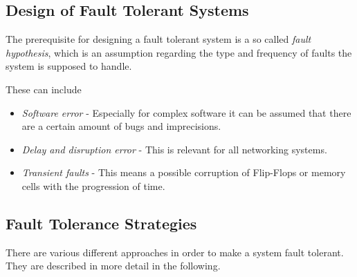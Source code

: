 \subsection{Design of Fault Tolerant Systems}
The prerequisite for designing a fault tolerant system is a so called \emph{fault hypothesis}, which is an assumption regarding the type and frequency of faults the system is supposed to handle.

These can include
\begin{itemize}
\item \emph{Software error} - Especially for complex software it can be assumed that there are a certain amount of bugs and imprecisions.
\item \emph{Delay and disruption error} - This is relevant for all networking systems.
\item \emph{Transient faults} - This means a possible corruption of Flip-Flops or memory cells with the progression of time.
\end{itemize}


\subsection{Fault Tolerance Strategies}
\label{sec:fault_tolerance_strategies}
There are various different approaches in order to make a system fault tolerant. They are described in more detail in the following.

